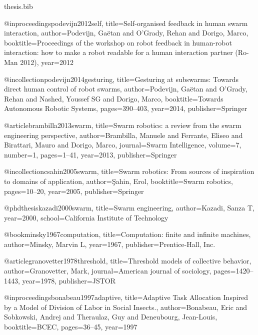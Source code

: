 \documentclass[a4paper, 12pt]{report}
\begin{document}
\newpage


\begin{filecontents}{thesis.bib}

@inproceedings{podevijn2012self,
  title={Self-organised feedback in human swarm interaction},
  author={Podevijn, Ga{\"e}tan and O’Grady, Rehan and Dorigo, Marco},
  booktitle={Proceedings of the workshop on robot feedback in human-robot interaction: how to make a robot readable for a human interaction partner (Ro-Man 2012)},
  year={2012}
}

@incollection{podevijn2014gesturing,
  title={Gesturing at subswarms: Towards direct human control of robot swarms},
  author={Podevijn, Ga{\"e}tan and O’Grady, Rehan and Nashed, Youssef SG and Dorigo, Marco},
  booktitle={Towards Autonomous Robotic Systems},
  pages={390--403},
  year={2014},
  publisher={Springer}
}

@article{brambilla2013swarm,
  title={Swarm robotics: a review from the swarm engineering perspective},
  author={Brambilla, Manuele and Ferrante, Eliseo and Birattari, Mauro and Dorigo, Marco},
  journal={Swarm Intelligence},
  volume={7},
  number={1},
  pages={1--41},
  year={2013},
  publisher={Springer}
}

@incollection{csahin2005swarm,
  title={Swarm robotics: From sources of inspiration to domains of application},
  author={{\c{S}}ahin, Erol},
  booktitle={Swarm robotics},
  pages={10--20},
  year={2005},
  publisher={Springer}
}

@phdthesis{kazadi2000swarm,
  title={Swarm engineering},
  author={Kazadi, Sanza T},
  year={2000},
  school={California Institute of Technology}
}

@book{minsky1967computation,
  title={Computation: finite and infinite machines},
  author={Minsky, Marvin L},
  year={1967},
  publisher={Prentice-Hall, Inc.}
}

@article{granovetter1978threshold,
  title={Threshold models of collective behavior},
  author={Granovetter, Mark},
  journal={American journal of sociology},
  pages={1420--1443},
  year={1978},
  publisher={JSTOR}
}

@inproceedings{bonabeau1997adaptive,
  title={Adaptive Task Allocation Inspired by a Model of Division of Labor in Social Insects.},
  author={Bonabeau, Eric and Sobkowski, Andrej and Theraulaz, Guy and Deneubourg, Jean-Louis},
  booktitle={BCEC},
  pages={36--45},
  year={1997}
}

\end{filecontents}

\nocite{*}


\end{document}
